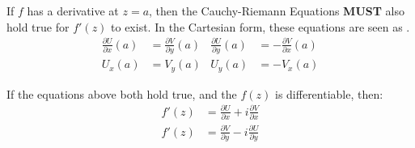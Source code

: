 If $f$ has a derivative at $z = a$, then the Cauchy-Riemann Equations \textbf{MUST} also hold true for $f'(z)$ to exist.
In the Cartesian form, these equations are seen as .
\begin{subequations}\label{eq:Cauchy_Riemann_Equations-Cartesian}
  \begin{equation}\label{subeq:Cauchy_Riemann_Equation-UxVy}
    \begin{aligned}
      \frac{\partial U}{\partial x} (a) &= \frac{\partial V}{\partial y} (a) \\
      U_{x} (a) &= V_{y} (a)
    \end{aligned}
  \end{equation}
  \begin{equation}\label{subeq:Cauchy_Riemann_Equation-UyVx}
    \begin{aligned}
      \frac{\partial U}{\partial y} (a) &= -\frac{\partial V}{\partial x} (a) \\
      U_{y} (a) &= -V_{x} (a)
    \end{aligned}
  \end{equation}
\end{subequations}

If the equations above both hold true, and the  $f(z)$ is differentiable, then:
\begin{equation}\label{eq:Complex_Function_Derivative-Cauchy_Riemann_Equation_Solution}
  \begin{aligned}
    f'(z) &= \frac{\partial U}{\partial x} + i \frac{\partial V}{\partial x} \\
    f'(z) &= \frac{\partial V}{\partial y} - i \frac{\partial U}{\partial y}
  \end{aligned}
\end{equation}

